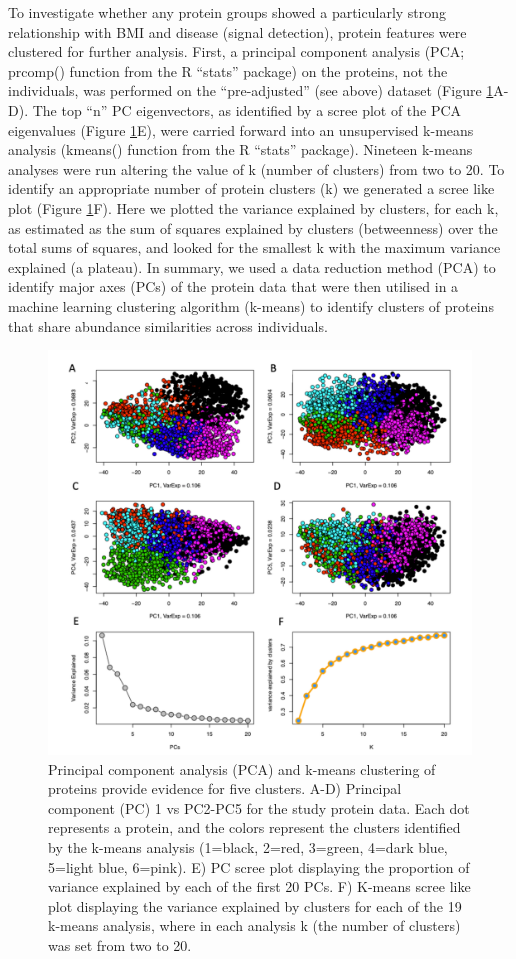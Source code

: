 \documentclass[11pt,twoside]{bristolthesis}
\begin{document}
To investigate whether any protein groups showed a particularly strong relationship with BMI and disease (signal detection), protein features were clustered for further analysis. First, a principal component analysis (PCA; prcomp() function from the R ``stats'' package) on the proteins, not the individuals, was performed on the ``pre-adjusted'' (see above) dataset (Figure \ref{fig:PCs}A-D). The top ``n'' PC eigenvectors, as identified by a scree plot of the PCA eigenvalues (Figure \ref{fig:PCs}E), were carried forward into an unsupervised k-means analysis (kmeans() function from the R ``stats'' package). Nineteen k-means analyses were run altering the value of k (number of clusters) from two to 20. To identify an appropriate number of protein clusters (k) we generated a scree like plot (Figure \ref{fig:PCs}F). Here we plotted the variance explained by clusters, for each k, as estimated as the sum of squares explained by clusters (betweenness) over the total sums of squares, and looked for the smallest k with the maximum variance explained (a plateau). In summary, we used a data reduction method (PCA) to identify major axes (PCs) of the protein data that were then utilised in a machine learning clustering algorithm (k-means) to identify clusters of proteins that share abundance similarities across individuals.
\begin{figure}
\includegraphics[width=0.9\linewidth,height=0.8\textheight]{figure/BMI_protein_INTERVAL/PCs2to5v1} \caption[Principal component analysis (PCA) and k-means clustering of proteins]{Principal component analysis (PCA) and k-means clustering of proteins provide evidence for five clusters. A-D) Principal component (PC) 1 vs PC2-PC5 for the study protein data. Each dot represents a protein, and the colors represent the clusters identified by the k-means analysis (1=black, 2=red, 3=green, 4=dark blue, 5=light blue, 6=pink). E) PC scree plot displaying the proportion of variance explained by each of the first 20 PCs. F) K-means scree like plot displaying the variance explained by clusters for each of the 19 k-means analysis, where in each analysis k (the number of clusters) was set from two to 20.}\label{fig:PCs}
\end{figure}
\end{document}
